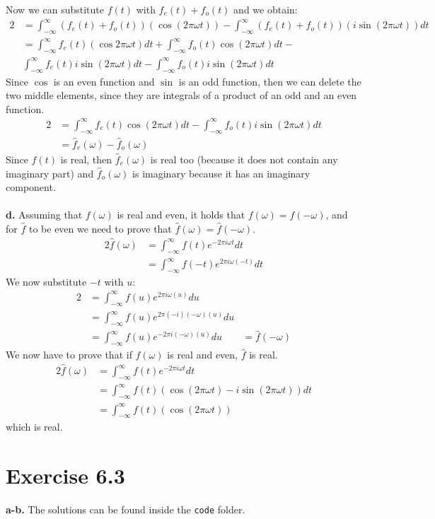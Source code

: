 \documentclass[12pt]{article}
\begin{document}
	Now we can substitute $f(t)$ with $f_e(t) + f_o(t)$ and we obtain:
	\begin{alignat*}{2}
		&=\int_{-\infty}^{\infty} (f_e(t) + f_o(t))(\cos(2\pi\omega t) ) - \int_{-\infty}^{\infty} (f_e(t) + f_o(t))(i \sin(2\pi\omega t)) dt\\
		&= \int_{-\infty}^{\infty} f_e(t)(\cos 2\pi\omega t) dt + \int_{-\infty}^{\infty} f_o(t)\cos(2\pi\omega t) dt -\\ 
		&\int_{-\infty}^{\infty} f_e(t)i \sin(2\pi\omega t) dt - \int_{-\infty}^{\infty} f_o(t)i \sin(2\pi\omega t) dt
	\end{alignat*}
	Since $\cos$ is an even function and $\sin$ is an odd function, then we can delete the two middle elements, since they are integrals of a product of an odd and an even function.
	\begin{alignat*}{2}
		&= \int_{-\infty}^{\infty} f_e(t)\cos(2\pi\omega t) dt - \int_{-\infty}^{\infty} f_o(t)i \sin(2\pi\omega t) dt\\
		&= \hat{f}_e(\omega) - \hat{f}_o(\omega)
	\end{alignat*}
	Since $f(t)$ is real, then $\hat{f}_e(\omega)$ is real too (because it does not contain any imaginary part) and $\hat{f}_o(\omega)$ is imaginary because it has an imaginary component.\\\\
	\textbf{d.} Assuming that $f(\omega)$ is real and even, it holds that $f(\omega) = f(-\omega)$, and for $\hat{f}$ to be even we need to prove that $\hat{f}(\omega) = \hat{f}(-\omega)$.
	\begin{alignat*}{2}
	\hat{f}(\omega) &= \int_{-\infty}^{\infty} f(t) e^{-2\pi i \omega t} dt\\
	&= \int_{-\infty}^{\infty} f(-t) e^{2\pi i \omega (-t)} dt
	\end{alignat*}
	We now substitute $-t$ with $u$:
	\begin{alignat*}{2}
	&= \int_{-\infty}^{\infty} f(u) e^{2\pi i \omega (u)} du\\
	&= \int_{-\infty}^{\infty} f(u) e^{2\pi (-i) (-\omega) (u)} du\\
	&= \int_{-\infty}^{\infty} f(u) e^{-2\pi i (-\omega) (u)} du &= \hat{f}(-\omega)
	\end{alignat*}
	We now have to prove that if $f(\omega)$ is real and even, $\hat{f}$ is real.
	\begin{alignat*}{2}
	\hat{f}(\omega) &= \int_{-\infty}^{\infty} f(t) e^{-2\pi i \omega t} dt\\
	&= \int_{-\infty}^{\infty} f(t)(\cos(2\pi\omega t) - i \sin(2\pi\omega t)) dt\\
	&= \int_{-\infty}^{\infty} f(t)(\cos(2\pi\omega t) )
	\end{alignat*}
	which is real.
	\section*{Exercise 6.3}
	\textbf{a-b.} The solutions can be found inside the \texttt{code} folder.
\end{document}
